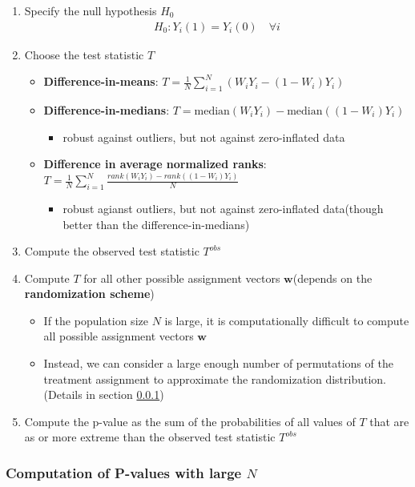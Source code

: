 \begin{enumerate}
    \item Specify the null hypothesis $H_0$
    \begin{align}
        H_0: Y_i(1) = Y_i(0) \quad \forall i
    \end{align}
    \item Choose the test statistic $T$
    \begin{itemize}
        \item \textbf{Difference-in-means}: $T = \frac{1}{N}\sum_{i=1}^N (W_iY_i - (1-W_i)Y_i)$
        \item \textbf{Difference-in-medians}: $T = \text{median}(W_iY_i) - \text{median}((1-W_i)Y_i)$
        \begin{itemize}
            \item[:]robust against outliers, but not against zero-inflated data
        \end{itemize}
        \item \textbf{Difference in average normalized ranks}: $T = \frac{1}{N}\sum_{i=1}^N \frac{rank(W_iY_i) - rank((1-W_i)Y_i)}{N}$
        \begin{itemize}
            \item[:]robust agianst outliers, but not against zero-inflated data(though better than the difference-in-medians)
        \end{itemize}
    \end{itemize}
    \item Compute the observed test statistic $T^{obs}$
    \item Compute $T$ for all other possible assignment vectors $\mathbf{w}$(depends on the \textbf{randomization scheme})
    \begin{itemize}
        \item If the population size $N$ is large, it is computationally difficult to compute all possible assignment vectors $\mathbf{w}$
        \item Instead, we can consider a large enough number of permutations of the treatment assignment to approximate the randomization distribution.(Details in section \ref{sec:computation_of_p_values_with_large_n})
    \end{itemize}
    \item Compute the p-value as the sum of the probabilities of all values of $T$ that are as or more extreme than the observed test statistic $T^{obs}$
\end{enumerate}

\subsubsection{Computation of P-values with large $N$}
\label{sec:computation_of_p_values_with_large_n}

